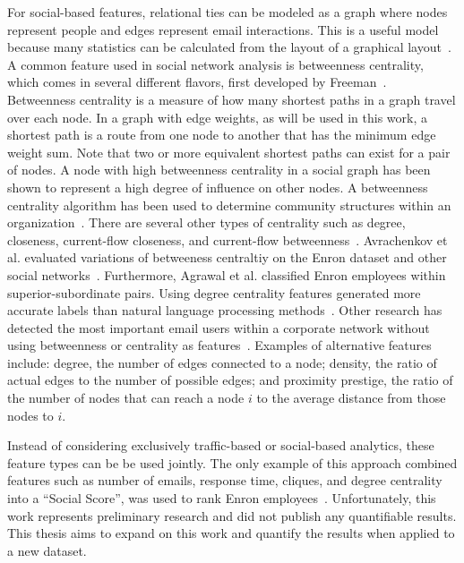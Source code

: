 \documentclass[12pt]{report}
\begin{document}
For social-based features, relational ties can be modeled as a graph where nodes represent people and edges represent email interactions.
This is a useful model because many statistics can be calculated from the layout of a graphical layout~\cite{wasserman_social_1994}.
A common feature used in social network analysis is betweenness centrality, which comes in several different flavors, first developed by Freeman~\cite{freeman_set_1977}.
Betweenness centrality is a measure of how many shortest paths in a graph travel over each node.
In a graph with edge weights, as will be used in this work, a shortest path is a route from one node to another that has the minimum edge weight sum.
Note that two or more equivalent shortest paths can exist for a pair of nodes.
A node with high betweenness centrality in a social graph has been shown to represent a high degree of influence on other nodes.
A betweenness centrality algorithm has been used to determine community structures within an organization~\cite{tyler_email_2003}.
There are several other types of centrality such as degree, closeness, current-flow closeness, and current-flow betweenness~\cite{balinsky2011rapid}.
Avrachenkov et al. evaluated variations of betweeness centraltiy on the Enron dataset and other social networks~\cite{avrachenkov2013alpha}.
Furthermore, Agrawal et al. classified Enron employees within superior-subordinate pairs.
Using degree centrality features generated more accurate labels than natural language processing methods~\cite{agarwal_comprehensive_2012}.
Other research has detected the most important email users within a corporate network without using betweenness or centrality as features~\cite{wilson_discovery_2009}.
Examples of alternative features include: degree, the number of edges connected to a node; density, the ratio of actual edges to the number of possible edges; and proximity prestige, the ratio of the number of nodes that can reach a node $i$ to the average distance from those nodes to $i$.

Instead of considering exclusively traffic-based or social-based analytics, these feature types can be be used jointly.
The only example of this approach combined features such as number of emails, response time, cliques, and degree centrality into a ``Social Score'', was used to rank Enron employees~\cite{rowe_automated_2007}.  
Unfortunately, this work represents preliminary research and did not publish any quantifiable results.
This thesis aims to expand on this work and quantify the results when applied to a new dataset.
\end{document}
